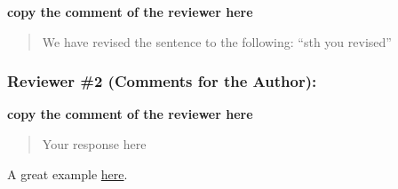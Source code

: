 \documentclass[review]{elsarticle} %
\begin{document}
\textbf{copy the comment of the reviewer here}

\begin{quote}
We have revised the sentence to the following: ``sth you revised''
\end{quote}

\subsubsection*{Reviewer \#2 (Comments for the
Author):}\label{reviewer-2-comments-for-the-author}

\textbf{copy the comment of the reviewer here}

\begin{quote}
Your response here
\end{quote}

A great example
\href{https://github.com/SchlossLab/Tomkovich_PEG3350_mSphere_2021/blob/master/submission/response_to_reviewers.md}{here}.
\end{document}
